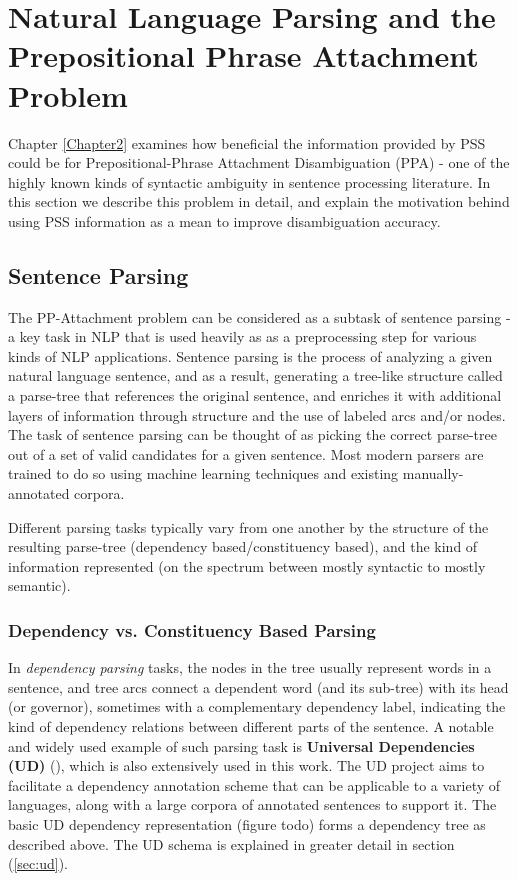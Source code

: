 \section{Natural Language Parsing and the Prepositional Phrase Attachment Problem} \label{sec:ppatt}

Chapter \ref{Chapter2} examines how beneficial the information provided by PSS could be for Prepositional-Phrase Attachment Disambiguation (PPA)  - one of the highly known kinds of syntactic ambiguity in sentence processing literature. In this section we describe this problem in detail, and explain the motivation behind using PSS information as a mean to improve disambiguation accuracy. 

\subsection{Sentence Parsing}

The PP-Attachment problem can be considered as a subtask of sentence parsing - a key task in NLP that is used heavily as as a preprocessing step for various kinds of NLP applications.  Sentence parsing is the process of analyzing a given natural language sentence, and as a result, generating a tree-like structure called a parse-tree that references the original sentence, and enriches it with additional layers of information through structure and the use of labeled arcs and/or nodes. The task of sentence parsing can be thought of as picking the correct parse-tree out of a set of valid candidates for a given sentence. Most modern parsers are trained to do so using machine learning techniques and existing manually-annotated corpora.

 Different parsing tasks typically vary from one another by the structure of the resulting parse-tree (dependency based/constituency based), and the kind of information represented (on the spectrum between mostly syntactic to mostly semantic).

\subsubsection{Dependency vs. Constituency Based Parsing}

In \emph{dependency parsing} tasks, the nodes in the tree usually represent words in a sentence, and tree arcs connect a dependent word (and its sub-tree) with its head (or governor), sometimes with a complementary dependency label, indicating the kind of dependency relations between different parts of the sentence. A notable and widely used example of such parsing task is \textbf{Universal Dependencies (UD)} (\cite{nivre-16}), which is also extensively used in this work. The UD project aims to facilitate a dependency annotation scheme that can be applicable to a variety of languages, along with a large corpora of annotated sentences to support it. The basic UD dependency representation (figure todo) forms a dependency tree as described above. The UD schema is explained in greater detail in section (\ref{sec:ud}).

